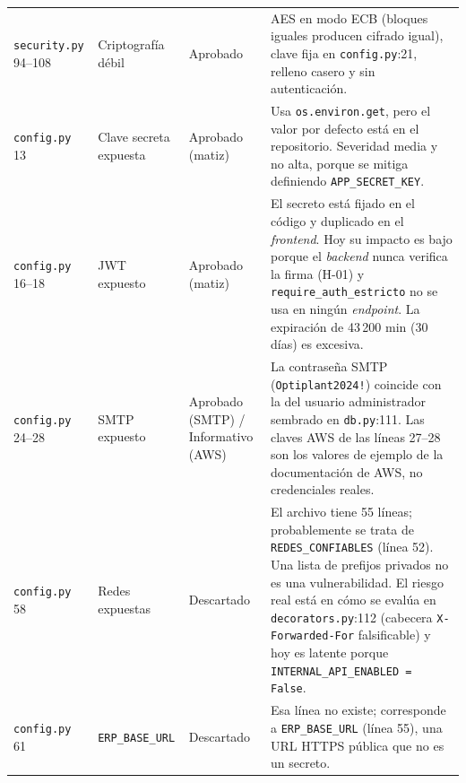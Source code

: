 \documentclass[11pt,letterpaper]{article}
\newcommand{\f}[1]{\texttt{#1}}
\begin{document}
\begin{small}
\begin{longtable}{p{2.9cm}p{2.4cm}p{2.3cm}p{7.6cm}}
\f{security.py} 94--108 & Criptografía débil & Aprobado & AES en modo ECB (bloques iguales producen cifrado igual), clave fija en \f{config.py}:21, relleno casero y sin autenticación. \\
\f{config.py} 13 & Clave secreta expuesta & Aprobado (matiz) & Usa \f{os.environ.get}, pero el valor por defecto está en el repositorio. Severidad media y no alta, porque se mitiga definiendo \f{APP\_SECRET\_KEY}. \\
\f{config.py} 16--18 & JWT expuesto & Aprobado (matiz) & El secreto está fijado en el código y duplicado en el \textit{frontend}. Hoy su impacto es bajo porque el \textit{backend} nunca verifica la firma (H-01) y \f{require\_auth\_estricto} no se usa en ningún \textit{endpoint}. La expiración de 43\,200 min (30 días) es excesiva. \\
\f{config.py} 24--28 & SMTP expuesto & Aprobado (SMTP) / Informativo (AWS) & La contraseña SMTP (\f{Optiplant2024!}) coincide con la del usuario administrador sembrado en \f{db.py}:111. Las claves AWS de las líneas 27--28 son los valores de ejemplo de la documentación de AWS, no credenciales reales. \\
\f{config.py} 58 & Redes expuestas & Descartado & El archivo tiene 55 líneas; probablemente se trata de \f{REDES\_CONFIABLES} (línea 52). Una lista de prefijos privados no es una vulnerabilidad. El riesgo real está en cómo se evalúa en \f{decorators.py}:112 (cabecera \f{X-Forwarded-For} falsificable) y hoy es latente porque \f{INTERNAL\_API\_ENABLED = False}. \\
\f{config.py} 61 & \f{ERP\_BASE\_URL} & Descartado & Esa línea no existe; corresponde a \f{ERP\_BASE\_URL} (línea 55), una URL HTTPS pública que no es un secreto. \\
\end{longtable}
\end{small}
\end{document}
